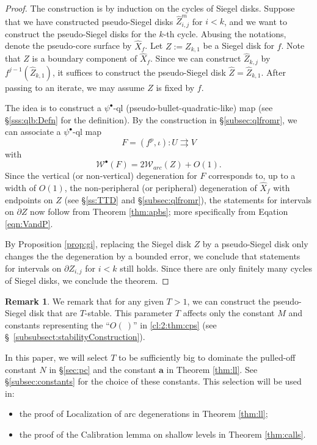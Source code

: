 \documentclass[11pt, reqno]{amsart}
\numberwithin{equation}{section}
\theoremstyle{plain}
\theoremstyle{theorem}
\theoremstyle{plain}
\theoremstyle{definition}
\newtheorem{rmk}[theorem]{Remark}
\numberwithin{figure}{section}
\newcommand{\Width}{{\mathcal W}}
\begin{document}
\begin{proof}
    The construction is by induction on the cycles of Siegel disks.
    Suppose that we have constructed pseudo-Siegel disks $\widehat{Z}_{i,j}^m$ for $i<k$, and we want to construct the pseudo-Siegel disks for the $k$-th cycle.
    Abusing the notations, denote the pseudo-core surface by $\widehat X_f$. 
    Let $Z := Z_{k, 1}$ be a Siegel disk for $f$.
    Note that $Z$ is a boundary component of $\widehat X_f$.
    Since we can construct $\widehat{Z}_{k, j}$ by $f^{j-1}(\widehat{Z}_{k, 1})$, it suffices to construct the pseudo-Siegel disk $\widehat{Z} = \widehat{Z}_{k, 1}$.
    After passing to an iterate, we may assume $Z$ is fixed by $f$.

    The idea is to construct a $\psi^\bullet$-ql (pseudo-bullet-quadratic-like) map (see \S \ref{sss:qlb:Defn} for the definition).
    By the construction in \S \ref{subsec:qlfromr}, we can associate a $\psi^\bullet$-ql map \[ F=(f^p,\iota) \colon U\rightrightarrows V\]
    with 
    \[\Width^\bullet(F) = 2\Width_{arc}(Z) + O(1).\]
    Since the vertical (or non-vertical) degeneration for $F$ corresponds to, up to a width of $O(1)$, the non-peripheral (or peripheral) degeneration of $\widehat X_f$ with endpoints on $Z$ (see \S \ref{ss:TTD} and \S \ref{subsec:qlfromr}), the statements for intervals on $\partial Z$ now follow from Theorem \ref{thm:apbs}; more specifically from Eqation \ref{eqn:VandP}.
    
    By Proposition \ref{prop:gi}, replacing the Siegel disk $Z$ by a pseudo-Siegel disk only changes the the degeneration by a bounded error, we conclude that statements for intervals on $\partial Z_{i,j}$ for $i < k$ still holds.
    Since there are only finitely many cycles of Siegel disks, we conclude the theorem.
\end{proof}

\begin{rmk}\label{rmk:stablitiy}
    We remark that for any given $T>1$, we can construct the pseudo-Siegel disk that are $T$-stable.
    This parameter $T$ affects only the constant $M$ and constants representing the ``$O(\ )$'' in \eqref{cl:2:thm:cps} (see \S~\ref{subsubsect:stabilityConstruction}).  

In this paper, we will select $T$ to be sufficiently big to dominate the pulled-off constant $N$ in \S \ref{sec:pc} and the constant $\mathbf{a}$ in Theorem \ref{thm:ll}. See \S \ref{subsec:constants} for the choice of these constants. This selection will be used in: 
\begin{itemize}
    \item the proof of Localization of arc degenerations in Theorem \ref{thm:ll}; 
    \item the proof of the Calibration lemma on shallow levels in Theorem \ref{thm:calls}.
\end{itemize}
\end{rmk}
\end{document}
